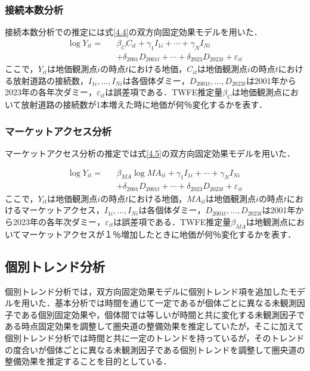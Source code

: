 \subsubsection{接続本数分析}
接続本数分析での推定には式\ref{4.4}の双方向固定効果モデルを用いた．
\begin{eqnarray}
    \log{Y_{it}}= &&\beta_{C}C_{it} + \gamma_{1}I_{1i} + \cdots + \gamma_{N}I_{Ni} \nonumber \\
    && + \delta_{2001}D_{2001t} + \cdots + \delta_{2023}D_{2023t} + \varepsilon_{it}
  \label{4.4}
\end{eqnarray}
ここで，$Y_{it}$は地価観測点$i$の時点$t$における地価，$C_{it}$は地価観測点$i$の時点$t$における放射道路の接続数，$I_{1i},...,I_{Ni}$は各個体ダミー，$D_{2001t},...,D_{2023t}$は2001年から2023年の各年次ダミー，$\varepsilon_{it}$は誤差項である．TWFE推定量$\beta_{C}$は地価観測点において放射道路の接続数が1本増えた時に地価が何％変化するかを表す．

\subsubsection{マーケットアクセス分析}
マーケットアクセス分析の推定では式\ref{4.5}の双方向固定効果モデルを用いた．

\begin{eqnarray}
  \log{Y_{it}}= &&\beta_{MA}\log{{MA}_{it}}+ \gamma_{1}I_{1i} + \cdots + \gamma_{N}I_{Ni}  \nonumber \\
    && + \delta_{2001}D_{2001t} + \cdots + \delta_{2023}D_{2023t} + \varepsilon_{it}
    \label{4.5}
\end{eqnarray}  
ここで，$Y_{it}$は地価観測点$i$の時点$t$における地価，$MA_{it}$は地価観測点$i$の時点$t$におけるマーケットアクセス，$I_{1i},...,I_{Ni}$は各個体ダミー，$D_{2001t},...,D_{2023t}$は2001年から2023年の各年次ダミー，$\varepsilon_{it}$は誤差項である．TWFE推定量$\beta_{MA}$は地観測点においてマーケットアクセスが１％増加したときに地価が何％変化するかを表す．
\subsection{個別トレンド分析}
個別トレンド分析では，双方向固定効果モデルに個別トレンド項を追加したモデルを用いた．基本分析では時間を通じて一定であるが個体ごとに異なる未観測因子である個別固定効果や，個体間では等しいが時間と共に変化する未観測因子である時点固定効果を調整して圏央道の整備効果を推定していたが，そこに加えて個別トレンド分析では時間と共に一定のトレンドを持っているが，そのトレンドの度合いが個体ごとに異なる未観測因子である個別トレンドを調整して圏央道の整備効果を推定することを目的としている．

